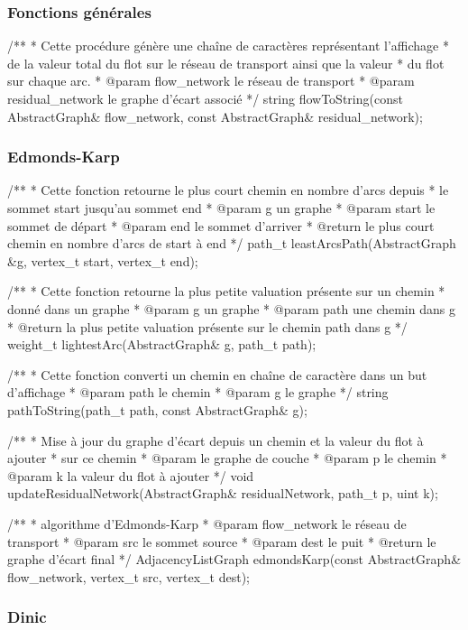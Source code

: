 \subsubsection{Fonctions générales}

/**
 * Cette procédure génère une chaîne de caractères représentant l'affichage
 * de la valeur total du flot sur le réseau de transport ainsi que la valeur
 * du flot sur chaque arc.
 * @param flow_network le réseau de transport
 * @param residual_network le graphe d'écart associé
 */
string
flowToString(const AbstractGraph& flow_network,
    const AbstractGraph& residual_network);



\subsubsection{Edmonds-Karp}

/**
 * Cette fonction retourne le plus court chemin en nombre d'arcs depuis
 * le sommet start jusqu'au sommet end
 * @param g un graphe
 * @param start le sommet de départ
 * @param end le sommet d'arriver
 * @return le plus court chemin en nombre d'arcs de start à end
 */
path_t
leastArcsPath(AbstractGraph &g, vertex_t start, vertex_t end);

/**
 * Cette fonction retourne la plus petite valuation présente sur un chemin 
 * donné dans un graphe
 * @param g un graphe
 * @param path une chemin dans g
 * @return la plus petite valuation présente sur le chemin path dans g 
 */
weight_t
lightestArc(AbstractGraph& g, path_t path);

/**
 * Cette fonction converti un chemin en chaîne de caractère dans un but d'affichage
 * @param path le chemin
 * @param g le graphe
 */
string
pathToString(path_t path, const AbstractGraph& g);

/**
 * Mise à jour du graphe d'écart depuis un chemin et la valeur du flot à ajouter
 * sur ce chemin
 * @param le graphe de couche
 * @param p le chemin
 * @param k la valeur du flot à ajouter
 */
void
updateResidualNetwork(AbstractGraph& residualNetwork, path_t p, uint k);


/**
 * algorithme d'Edmonds-Karp
 * @param flow_network le réseau de transport
 * @param src le sommet source
 * @param dest le puit
 * @return le graphe d'écart final
 */
AdjacencyListGraph
edmondsKarp(const AbstractGraph& flow_network, vertex_t src, vertex_t dest);



\subsubsection{Dinic}


